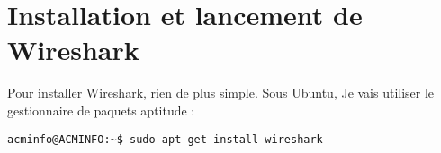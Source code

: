 \chapter{Installation et lancement de Wireshark}
\begin{onehalfspace}

Pour installer Wireshark, rien de plus simple.
Sous Ubuntu, Je vais utiliser le gestionnaire de paquets aptitude :

\noindent 
\begin{lstlisting}
acminfo@ACMINFO:~$ sudo apt-get install wireshark
\end{lstlisting}

\vspace{1\baselineskip}








\end{onehalfspace}